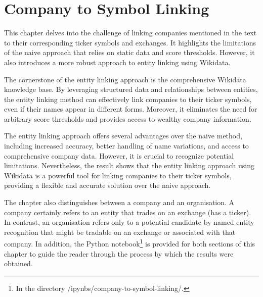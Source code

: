 \chapter{Company to Symbol Linking}
\label{chap:comapny-to-symbol-linking}
This chapter delves into the challenge of linking companies mentioned in the text to their corresponding ticker symbols and exchanges. It highlights the limitations of the naive approach that relies on static data and score thresholds. However, it also introduces a more robust approach to entity linking using Wikidata. 

The cornerstone of the entity linking approach is the comprehensive Wikidata knowledge base. By leveraging structured data and relationships between entities, the entity linking method can effectively link companies to their ticker symbols, even if their names appear in different forms. Moreover, it eliminates the need for arbitrary score thresholds and provides access to wealthy company information.

The entity linking approach offers several advantages over the naive method, including increased accuracy, better handling of name variations, and access to comprehensive company data. However, it is crucial to recognize potential limitations. Nevertheless, the result shows that the entity linking approach using Wikidata is a powerful tool for linking companies to their ticker symbols, providing a flexible and accurate solution over the naive approach.%

The chapter also distinguishes between a company and an organisation. A company certainly refers to an entity that trades on an exchange (has a ticker). In contrast, an organisation refers only to a potential candidate by named entity recognition that might be tradable on an exchange or associated with that company. In addition, the Python notebook\footnote{In the directory /ipynbs/company-to-symbol-linking/.} is provided for both sections of this chapter to guide the reader through the process by which the results were obtained.

